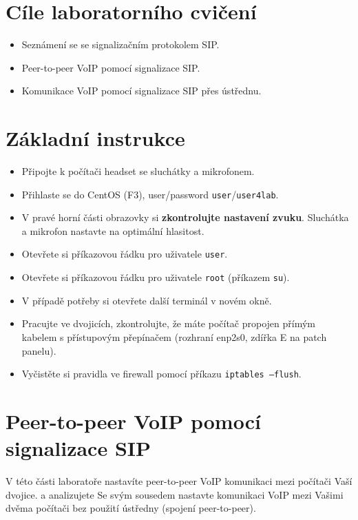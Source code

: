 \section*{Cíle laboratorního cvičení}
\begin{itemize}
  \item Seznámení se se signalizačním protokolem SIP.
  \item Peer-to-peer VoIP pomocí signalizace SIP.
  \item Komunikace VoIP pomocí signalizace SIP přes ústřednu.
\end{itemize}

\section*{Základní instrukce}
\begin{itemize}
  \item Připojte k počítači headset se sluchátky a mikrofonem.
  \item Přihlaste se do CentOS (F3), user/password {\tt user}/{\tt user4lab}.
  \item V pravé horní části obrazovky si {\bf zkontrolujte nastavení zvuku}. Sluchátka a mikrofon nastavte na optimální hlasitost.
  \item Otevřete si příkazovou řádku pro uživatele {\tt user}.
  \item Otevřete si příkazovou řádku pro uživatele {\tt root} (příkazem {\tt su}).
  \item V případě potřeby si otevřete další terminál v novém okně.
  \item Pracujte ve dvojicích, zkontrolujte, že máte počítač propojen
    přímým kabelem s přístupovým přepínačem (rozhraní enp2s0, zdířka E na patch panelu).
  \item Vyčistěte si pravidla ve firewall pomocí příkazu {\tt iptables --flush}.
\end{itemize}

\section{Peer-to-peer VoIP pomocí signalizace SIP}
V této části laboratoře nastavíte peer-to-peer VoIP komunikaci mezi počítači Vaší dvojice. a analizujete
Se svým sousedem nastavte komunikaci VoIP mezi Vašimi dvěma počítači bez použití ústředny (spojení peer-to-peer).

